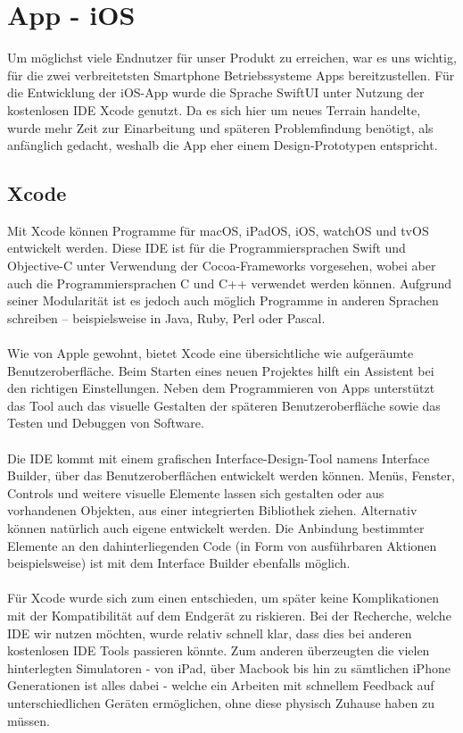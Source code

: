 \section{App - iOS}
Um möglichst viele Endnutzer für unser Produkt zu erreichen, war es uns wichtig, für die zwei verbreitetsten Smartphone Betriebssysteme Apps bereitzustellen. Für die Entwicklung der iOS-App wurde die Sprache SwiftUI unter Nutzung der  kostenlosen IDE Xcode genutzt.  Da es sich hier um neues Terrain handelte, wurde mehr Zeit zur Einarbeitung und späteren Problemfindung benötigt, als anfänglich gedacht, weshalb die App eher einem Design-Prototypen entspricht. 

\subsection{Xcode}
Mit Xcode können Programme für macOS, iPadOS, iOS, watchOS und tvOS entwickelt werden. Diese IDE ist für die Programmiersprachen Swift und Objective-C unter Verwendung der Cocoa-Frameworks vorgesehen, wobei aber auch die Programmiersprachen C und C++ verwendet werden können. Aufgrund seiner Modularität ist es jedoch auch möglich Programme in anderen Sprachen schreiben – beispielsweise in Java, Ruby, Perl oder Pascal. \cite{Ahmad2020}
\\
\\
Wie von Apple gewohnt, bietet Xcode eine übersichtliche wie aufgeräumte Benutzeroberfläche. Beim Starten eines neuen Projektes hilft ein Assistent bei den richtigen Einstellungen. Neben dem Programmieren von Apps unterstützt das Tool auch das visuelle Gestalten der späteren Benutzeroberfläche sowie das Testen und Debuggen von Software. \cite{Ahmad2020}
\\
\\
Die IDE kommt mit einem grafischen Interface-Design-Tool namens Interface Builder, über das Benutzeroberflächen entwickelt werden können. Menüs, Fenster, Controls und weitere visuelle Elemente lassen sich gestalten oder aus vorhandenen Objekten, aus einer integrierten Bibliothek ziehen. Alternativ können natürlich auch eigene entwickelt werden. Die Anbindung bestimmter Elemente an den dahinterliegenden Code (in Form von ausführbaren Aktionen beispielsweise) ist mit dem Interface Builder ebenfalls möglich.\cite{Ahmad2020}
\\
\\
Für Xcode wurde sich zum einen entschieden, um später keine Komplikationen mit der Kompatibilität auf dem Endgerät zu riskieren. Bei der Recherche, welche IDE wir nutzen möchten, wurde relativ schnell klar, dass dies bei anderen kostenlosen IDE Tools passieren könnte. Zum anderen überzeugten die vielen hinterlegten Simulatoren - von iPad, über Macbook bis hin zu sämtlichen iPhone Generationen ist alles dabei - welche ein Arbeiten mit schnellem Feedback auf unterschiedlichen Geräten ermöglichen, ohne diese physisch Zuhause haben zu müssen.

